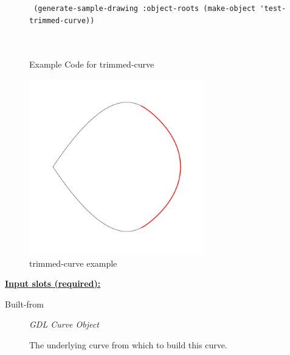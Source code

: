 \documentclass [11pt]{book}
\begin{document}
\begin{itemize}
\begin{figure}
\begin{lrbox}{\boxedverb}
\begin{minipage}{\linewidth}
{\begin{verbatim}
 (generate-sample-drawing :object-roots (make-object 'test-trimmed-curve))

   
\end{verbatim}}
\end{minipage}
\end{lrbox}
\fbox{\usebox{\boxedverb}}

\caption{Example Code for trimmed-curve}

\label{fig:example-code-trimmed-curve}

\end{figure}

\begin{figure}
\begin{center}
\includegraphics[width=3in,height=3in]{../images/example-trimmed-curve.pdf}
\end{center}

\caption{trimmed-curve example}

\label{fig:trimmed-curve}

\end{figure}





\textbf{
\underline{Input slots (required):}}

\begin{description}

\item [Built-from]
\emph{GDL Curve Object}

 The underlying curve from which to build this curve.




\end{description}







\end{itemize}
\end{document}
